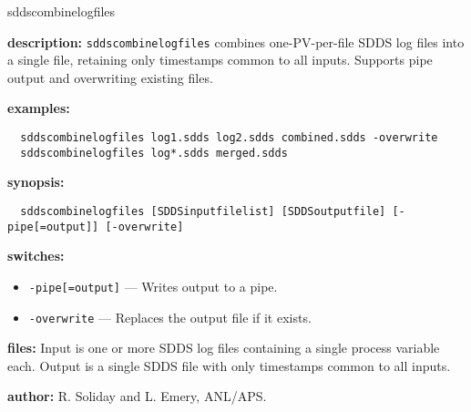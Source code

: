 \begin{sddsprog}{sddscombinelogfiles}
  \item \textbf{description:} \verb|sddscombinelogfiles| combines one-PV-per-file SDDS log files into a single file, retaining only timestamps common to all inputs. Supports pipe output and overwriting existing files.
  \item \textbf{examples:}
  \begin{verbatim}
  sddscombinelogfiles log1.sdds log2.sdds combined.sdds -overwrite
  sddscombinelogfiles log*.sdds merged.sdds
  \end{verbatim}
  \item \textbf{synopsis:}
  \begin{verbatim}
  sddscombinelogfiles [SDDSinputfilelist] [SDDSoutputfile] [-pipe[=output]] [-overwrite]
  \end{verbatim}
  \item \textbf{switches:}
    \begin{itemize}
      \item \verb|-pipe[=output]| --- Writes output to a pipe.
      \item \verb|-overwrite| --- Replaces the output file if it exists.
    \end{itemize}
  \item \textbf{files:} Input is one or more SDDS log files containing a single process variable each. Output is a single SDDS file with only timestamps common to all inputs.
  \item \textbf{author:} R. Soliday and L. Emery, ANL/APS.
\end{sddsprog}
